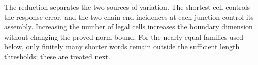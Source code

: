 The reduction separates the two sources of variation. The shortest cell
controls the response error, and the two chain-end incidences at each
junction control its assembly. Increasing the number of legal cells
increases the boundary dimension without changing the proved norm bound.
For the nearly equal families used below, only finitely many shorter words
remain outside the sufficient length thresholds; these are treated next.
